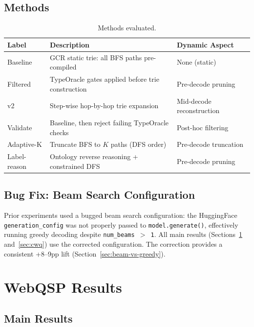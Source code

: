 \documentclass[11pt,twoside]{article}
\begin{document}
\subsection{Methods}

\begin{table}[H]
  \centering
  \caption{Methods evaluated.}
  \label{tab:methods}
  \begin{tabular}{lll}
    \toprule
    \textbf{Label} & \textbf{Description} & \textbf{Dynamic Aspect} \\
    \midrule
    Baseline & GCR static trie: all BFS paths pre-compiled & None (static) \\
    Filtered & TypeOracle gates applied before trie construction & Pre-decode pruning \\
    v2 & Step-wise hop-by-hop trie expansion & Mid-decode reconstruction \\
    Validate & Baseline, then reject failing TypeOracle checks & Post-hoc filtering \\
    Adaptive-K & Truncate BFS to \(K\) paths (DFS order) & Pre-decode truncation \\
    Label-reason & Ontology reverse reasoning + constrained DFS & Pre-decode pruning \\
    \bottomrule
  \end{tabular}
\end{table}

\subsection{Bug Fix: Beam Search Configuration}

Prior experiments used a bugged beam search configuration: the HuggingFace
\texttt{generation\_config} was not properly passed to
\texttt{model.generate()}, effectively running greedy decoding despite
\texttt{num\_beams \(>\) 1}. All main results (Sections~\ref{sec:webqsp}
and~\ref{sec:cwq}) use the corrected configuration. The correction provides a
consistent +8--9pp lift (Section~\ref{sec:beam-vs-greedy}).

\section{WebQSP Results}
\label{sec:webqsp}

\subsection{Main Results}
\end{document}
